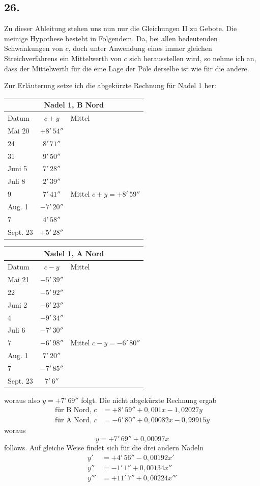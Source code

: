 \documentclass[12pt,a4paper]{article}
\begin{document}
\subsection*{26.}
Zu dieser Ableitung stehen uns nun nur die Gleichungen II zu Gebote. Die meinige Hypothese besteht in Folgendem. Da, bei allen bedeutenden Schwankungen von $c$, doch unter Anwendung eines immer gleichen Streichverfahrens ein Mittelwerth von $c$ sich herausstellen wird, so nehme ich an, dass der Mittelwerth für die eine Lage der Pole derselbe ist wie für die andere.

Zur Erläuterung setze ich die abgekürzte Rechnung für Nadel 1 her:

\begin{center}
\small
\begin{tabular}{l|c|l}
\multicolumn{3}{c}{Nadel 1, B Nord} \\
\hline
Datum & $c + y$ & Mittel \\
\hline
Mai 20 & $+8'\,54''$ & \\
24 & $8'\,71''$ & \\
31 & $9'\,50''$ & \\
Juni 5 & $7'\,28''$ & \\
Juli 8 & $2'\,39''$ & \\
9 & $7'\,41''$ & Mittel $c + y = +8'\,59''$ \\
Aug. 1 & $-7'\,20''$ & \\
7 & $4'\,58''$ & \\
Sept. 23 & $+5'\,28''$ & \\
\end{tabular}
\quad
\begin{tabular}{l|c|l}
\multicolumn{3}{c}{Nadel 1, A Nord} \\
\hline
Datum & $c - y$ & Mittel \\
\hline
Mai 21 & $-5'\,39''$ & \\
22 & $-5'\,92''$ & \\
Juni 2 & $-6'\,23''$ & \\
4 & $-9'\,34''$ & \\
Juli 6 & $-7'\,30''$ & \\
7 & $-6'\,98''$ & Mittel $c - y = -6'\,80''$ \\
Aug. 1 & $7'\,20''$ & \\
7 & $-7'\,85''$ & \\
Sept. 23 & $7'\,6''$ & \\
\end{tabular}
\end{center}
woraus also $y = +7'\,69''$ folgt. Die nicht abgekürzte Rechnung ergab
\begin{align*}
\text{für B Nord, } c &= +8'\,59'' + 0{,}001 x - 1{,}02027 y \\
\text{für A Nord, } c &= -6'\,80'' + 0{,}00082 x - 0{,}99915 y
\end{align*}
woraus
\[ y = +7'\,69'' + 0{,}00097 x \]
follows. Auf gleiche Weise findet sich für die drei andern Nadeln
\begin{align*}
y' &= +4'\,56'' - 0{,}00192 x' \\
y'' &= -1'\,1'' + 0{,}00134 x'' \\
y''' &= +11'\,7'' + 0{,}00224 x'''
\end{align*}
\end{document}
